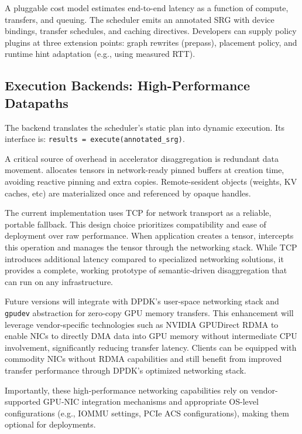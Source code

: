 A pluggable cost model estimates end-to-end latency as a function of compute, transfers, and queuing.
The scheduler emits an annotated SRG with device bindings, transfer schedules, and caching directives.
Developers can supply policy plugins at three extension points: graph rewrites (prepass), placement policy, and runtime hint adaptation (e.g., using measured RTT).


\subsection{Execution Backends: High-Performance Datapaths}
\label{ssec:zerocopy}

The backend translates the scheduler's static plan into dynamic execution. Its interface is:
\texttt{results = execute(anno\-tated\_srg)}.

A critical source of overhead in accelerator disaggregation is redundant data movement. 
\sys allocates tensors in network-ready pinned buffers at creation time, avoiding reactive pinning and extra copies.
Remote-sesident objects (weights, KV caches, etc) are materialized once and referenced by opaque handles.

The current implementation uses TCP for network transport as a reliable, portable fallback. This design choice prioritizes compatibility and ease of deployment over raw performance. When application creates a tensor, \sys intercepts this operation and manages the tensor through the networking stack. While TCP introduces additional latency compared to specialized networking solutions, it provides a complete, working prototype of semantic-driven disaggregation that can run on any infrastructure.

Future versions will integrate \sys with DPDK's user-space networking stack and \texttt{gpudev} abstraction for zero-copy GPU memory transfers. This enhancement will leverage vendor-specific technologies such as NVIDIA GPUDirect RDMA to enable NICs to directly DMA data into GPU memory without intermediate CPU involvement, significantly reducing transfer latency. Clients can be equipped with commodity NICs without RDMA capabilities and still benefit from improved transfer performance through DPDK's optimized networking stack.

Importantly, these high-performance networking capabilities rely on vendor-supported GPU-NIC integration mechanisms and appropriate OS-level configurations (e.g., IOMMU settings, PCIe ACS configurations), making them optional for \sys deployments.

